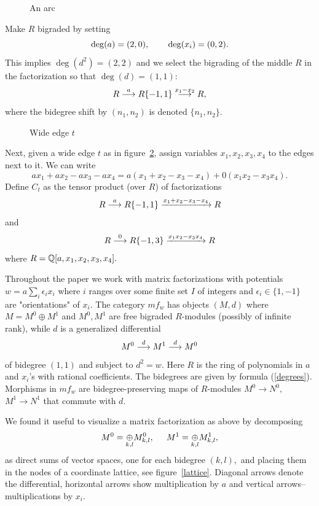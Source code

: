 \documentclass[12pt]{article}
\newcommand{\oplusop}[1]{{\mathop{\oplus}\limits_{#1}}}
\begin{document}
\begin{figure} \label{arc}  \caption{An arc} 
\end{figure} 
       
Make $R$ bigraded by setting 
\begin{equation}\label{degrees}\deg(a) = (2,0), \hspace{0.3in} \deg(x_i)=(0,2).
\end{equation} 
This implies $\deg(d^2) = (2,2)$ and we select the bigrading 
of the middle $R$ in the factorization so that 
$\deg(d)= (1,1)$: 
 \begin{equation}\label{arcfact} 
  R \stackrel{a}{\longrightarrow} R\{-1,1\} \stackrel{x_1 -x_2}{\longrightarrow} R,\end{equation}  
where the bidegree shift by $(n_1,n_2)$ is denoted $\{n_1,n_2\}.$ 

\begin{figure}  
\caption{Wide edge $t$} \label{xonefour} \end{figure}

Next, given a wide edge $t$ as in figure~\ref{xonefour}, 
assign variables 
$x_1,x_2,x_3,x_4$ to the edges next to it. We can write 
$$ ax_1 + ax_2 - ax_3 -ax_4 = a(x_1+x_2-x_3-x_4) + 0 (x_1 x_2-x_3x_4).$$ 
Define $C_t$ as the tensor product (over $R$) of factorizations 
\begin{equation}
 R \stackrel{a}{\longrightarrow} R\{-1,1\} \xrightarrow{x_1+x_2-x_3-x_4} R\end{equation} 
and 
\begin{equation} 
 R\stackrel{0}{\longrightarrow} R\{-1,3\} \xrightarrow{x_1 x_2 - x_3 x_4} R\end{equation}  
where $R= \mathbb Q[a,x_1,x_2,x_3,x_4].$ 

Throughout the paper we work with matrix factorizations with 
potentials $w=a \sum_i \epsilon_i x_i$ where $i$ ranges over some finite set $I$ 
of integers and $\epsilon_i\in \{1,-1\}$ are "orientations" of $x_i.$ The category 
$mf_w$ has objects $(M,d)$ where $M=M^0\oplus M^1$ and $M^0,M^1$ 
are free bigraded $R$-modules (possibly of infinite rank), while $d$ is a generalized 
differential 
$$ M^0 \stackrel{d}{\longrightarrow} M^1 \stackrel{d}{\longrightarrow} M^0$$ 
of bidegree $(1,1)$ and subject to $d^2=w.$ Here $R$ is the ring of 
polynomials in $a$ and $x_i$'s with rational coefficients. The bidegrees are 
given by formula (\ref{degrees}).  Morphisms in $mf_w$ are bidegree-preserving 
maps of $R$-modules $M^0\to N^0,$ $M^1\to N^1$ that commute with 
$d.$ 

We found it useful to visualize a matrix factorization as above by 
decomposing 
$$M^0=\oplusop{k,l} M^0_{k,l}, \hspace{0.2in} 
 M^1=\oplusop{k,l} M^1_{k,l},$$ 
as direct sums of vector spaces, 
one for each bidegree $(k,l),$ and placing 
them in the nodes of a coordinate lattice, see figure~\ref{lattice}. 
Diagonal arrows denote the differential, horizontal arrows show multiplication 
by $a$ and vertical arrows--multiplications by $x_i.$ 
\end{document}
